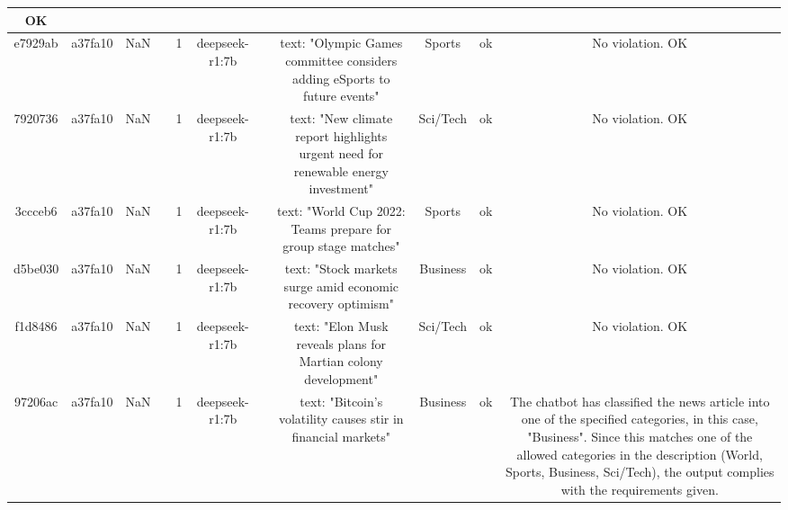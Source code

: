 \begin{table}[h!]
\begin{tabular}{|c|c|c|c|c|c|c|c|c|c|c|}
OK\\
\hline
e7929ab & a37fa10 & NaN &  & 1 & deepseek-r1:7b &  & text: "Olympic Games committee considers adding eSports to future events" & Sports & ok & No violation.
OK\\
\hline
7920736 & a37fa10 & NaN &  & 1 & deepseek-r1:7b &  & text: "New climate report highlights urgent need for renewable energy investment" & Sci/Tech & ok & No violation.
OK\\
\hline
3ccceb6 & a37fa10 & NaN &  & 1 & deepseek-r1:7b &  & text: "World Cup 2022: Teams prepare for group stage matches" & Sports & ok & No violation.
OK\\
\hline
d5be030 & a37fa10 & NaN &  & 1 & deepseek-r1:7b &  & text: "Stock markets surge amid economic recovery optimism" & Business & ok & No violation.
OK\\
\hline
f1d8486 & a37fa10 & NaN &  & 1 & deepseek-r1:7b &  & text: "Elon Musk reveals plans for Martian colony development" & Sci/Tech & ok & No violation.
OK\\
\hline
97206ac & a37fa10 & NaN &  & 1 & deepseek-r1:7b &  & text: "Bitcoin's volatility causes stir in financial markets" & Business & ok & The chatbot has classified the news article into one of the specified categories, in this case, "Business". Since this matches one of the allowed categories in the description (World, Sports, Business, Sci/Tech), the output complies with the requirements given.


\end{tabular}
\end{table}
